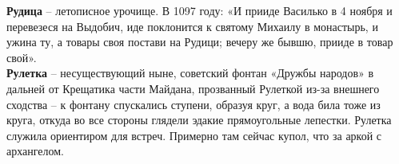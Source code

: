 
\textbf{Рудица} – летописное урочище. В 1097 году: «И прииде Василько в 4 ноября и перевезеся на Выдобич, иде поклонится к святому Михаилу в монастырь, и ужина ту, а товары своя постави на Рудици; вечеру же бывшю, прииде в товар свой».\\

\textbf{Рулетка} – несуществующий ныне, советский фонтан «Дружбы народов» в дальней от Крещатика части Майдана, прозванный Рулеткой из-за внешнего сходства – к фонтану спускались ступени, образуя круг, а вода била тоже из круга, откуда во все стороны глядели эдакие прямоугольные лепестки. Рулетка служила ориентиром для встреч. Примерно там сейчас купол, что за аркой с архангелом.
